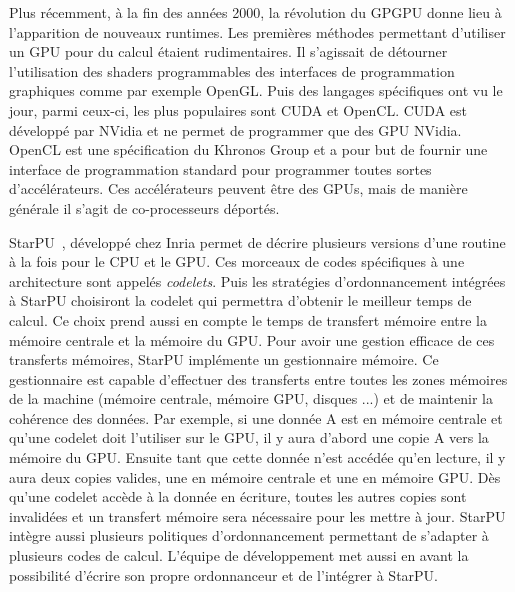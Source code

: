 Plus récemment, à la fin des années 2000, la révolution du GPGPU donne lieu à l'apparition de nouveaux runtimes.
%
Les premières méthodes permettant d'utiliser un GPU pour du calcul étaient rudimentaires.
%
Il s'agissait de détourner l'utilisation des shaders programmables des interfaces de programmation graphiques comme par exemple OpenGL.
%
Puis des langages spécifiques ont vu le jour, parmi ceux-ci, les plus populaires sont CUDA et OpenCL.
%
CUDA est développé par NVidia et ne permet de programmer que des GPU NVidia.
%
OpenCL est une spécification du Khronos Group et a pour but de fournir une interface de programmation standard pour programmer toutes sortes d'accélérateurs.
%
Ces accélérateurs peuvent être des GPUs, mais de manière générale il s'agit de co-processeurs déportés.



StarPU~\cite{starpu}, développé chez Inria permet de décrire plusieurs versions d'une routine à la fois pour le CPU et le GPU.
%
Ces morceaux de codes spécifiques à une architecture sont appelés {\em codelets}.
%
Puis les stratégies d'ordonnancement intégrées à StarPU choisiront la codelet qui permettra d'obtenir le meilleur temps de calcul.
%
Ce choix prend aussi en compte le temps de transfert mémoire entre la mémoire centrale et la mémoire du GPU.
%
Pour avoir une gestion efficace de ces transferts mémoires, StarPU implémente un gestionnaire mémoire.
%
Ce gestionnaire est capable d'effectuer des transferts entre toutes les zones mémoires de la machine (mémoire centrale, mémoire GPU, disques ...) et de maintenir la cohérence des données.
%
Par exemple, si une donnée A est en mémoire centrale et qu'une codelet doit l'utiliser sur le GPU, il y aura d'abord une copie A vers la mémoire du GPU.
%
Ensuite tant que cette donnée n'est accédée qu'en lecture, il y aura deux copies valides, une en mémoire centrale et une en mémoire GPU.
%
Dès qu'une codelet accède à la donnée en écriture, toutes les autres copies sont invalidées et un transfert mémoire sera nécessaire pour les mettre à jour.
%
StarPU intègre aussi plusieurs politiques d'ordonnancement permettant de s'adapter à plusieurs codes de calcul.
%
L'équipe de développement met aussi en avant la possibilité d'écrire son propre ordonnanceur et de l'intégrer à StarPU.



